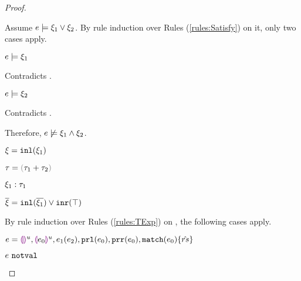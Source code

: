 \begin{proof}
\begin{byCases}
\begin{byCases}
        Assume $e \models \xi_1 \vee \xi_2$. By rule induction over Rules (\ref{rules:Satisfy}) on it, only two cases apply.
        \begin{byCases}
        \item[\text{(\ref{rule:CSOr1})}]
            \begin{pfsteps*}
            \item $e \models \xi_1$ 
            \end{pfsteps*}
            Contradicts .
        \item[\text{(\ref{rule:CSOr2})}]
            \begin{pfsteps*}
            \item $e \models \xi_2$ 
            \end{pfsteps*}
            Contradicts .
        \end{byCases}
        Therefore, $e \not\models \xi_1 \wedge \xi_2$.
    \end{byCases}
\item[\text{(\ref{rule:CTInl})}]
    \begin{pfsteps*}
    \item $\xi=\mathtt{inl}(\xi_1)$ 
    \item $\tau=\tsum{\tau_1}{\tau_2}$ 
    \item $\xi_1 : \tau_1$  
    \item $\overline{\xi}=\mathtt{inl}(\overline{\xi_1}) \vee \mathtt{inr}(\top)$ 
    \end{pfsteps*}
    By rule induction over Rules (\ref{rules:TExp}) on , the following cases apply.
    \begin{byCases}
    \item[\text{(\ref{rule:TEHole}),(\ref{rule:THole}),(\ref{rule:TAp}),(\ref{rule:TPrl}),(\ref{rule:TPrr}),(\ref{rule:TMatchZPre}),(\ref{rule:TMatchNZPre})}]
        \begin{pfsteps*}
        \item $e=\textcolor{violet}{\llparenthesis}\textcolor{violet}{\rrparenthesis}^{u},\textcolor{violet}{\llparenthesis} e_0\textcolor{violet}{\rrparenthesis}^{u},e_1(e_2),\mathtt{prl}(e_0),\mathtt{prr}(e_0),\mathtt{match}(e_0) \{\hat{rs}\}$ 
        \item $e ~\mathtt{notval}$  

\end{pfsteps*}
\end{byCases}
\end{byCases}
\end{proof}
